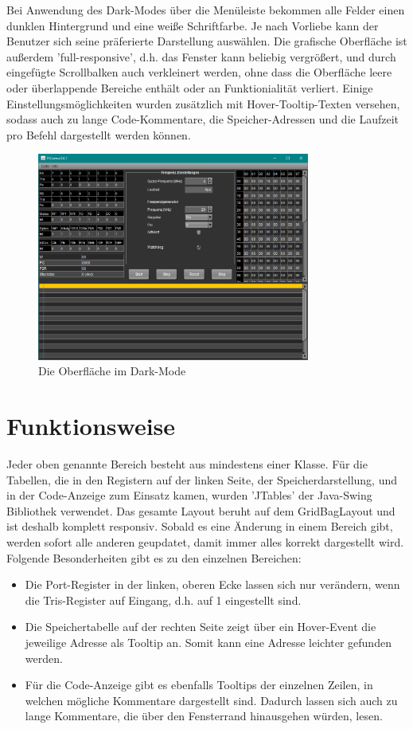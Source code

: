 Bei Anwendung des Dark-Modes über die Menüleiste bekommen alle Felder einen dunklen Hintergrund und eine weiße Schriftfarbe. Je nach Vorliebe kann der Benutzer sich seine präferierte Darstellung auswählen. Die grafische Oberfläche ist außerdem 'full-responsive', d.h. das Fenster kann beliebig vergrößert, und durch eingefügte Scrollbalken auch verkleinert werden, ohne dass die Oberfläche leere oder überlappende Bereiche enthält oder an Funktionialität verliert. 
Einige Einstellungsmöglichkeiten wurden zusätzlich mit Hover-Tooltip-Texten versehen, sodass auch zu lange Code-Kommentare, die Speicher-Adressen und die Laufzeit pro Befehl dargestellt werden können. 
\begin{figure}[ht]
	\centering
	\includegraphics[width=0.8\textwidth]{img/gui-dark}
	\caption{Die Oberfläche im Dark-Mode}
	\label{gui-dark}
\end{figure}
\section{Funktionsweise}
Jeder oben genannte Bereich besteht aus mindestens einer Klasse. Für die Tabellen, die in den Registern auf der linken Seite, der Speicherdarstellung, und in der Code-Anzeige zum Einsatz kamen, wurden 'JTables' der Java-Swing Bibliothek verwendet. Das gesamte Layout beruht auf dem GridBagLayout und ist deshalb komplett responsiv. Sobald es eine Änderung in einem Bereich gibt, werden sofort alle anderen geupdatet, damit immer alles korrekt dargestellt wird. Folgende Besonderheiten gibt es zu den einzelnen Bereichen:
\begin{itemize}
	\item Die Port-Register in der linken, oberen Ecke lassen sich nur verändern, wenn die Tris-Register auf Eingang, d.h. auf 1 eingestellt sind.
	\item Die Speichertabelle auf der rechten Seite zeigt über ein Hover-Event die jeweilige Adresse als Tooltip an. Somit kann eine Adresse leichter gefunden werden. 
	\item Für die Code-Anzeige gibt es ebenfalls Tooltips der einzelnen Zeilen, in welchen mögliche Kommentare dargestellt sind. Dadurch lassen sich auch zu lange Kommentare, die über den Fensterrand hinausgehen würden, lesen. 
\end{itemize}

